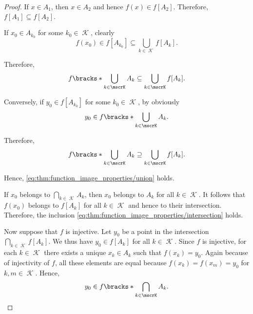 \begin{proof}
   If \( x \in A_1 \), then \( x \in A_2 \) and hence \( f(x) \in f[A_2] \). Therefore, \( f[A_1] \subseteq f[A_2] \).

   If \( x_0 \in A_{k_0} \) for some \( k_0 \in \mscrK \), clearly
  \begin{equation*}
    f(x_0) \in f[A_{k_0}] \subseteq \bigcup_{k \in \mscrK} f[A_k].
  \end{equation*}

  Therefore,
  \begin{equation*}
    f\bracks*{ \bigcup_{k \in \mscrK} A_k } \subseteq \bigcup_{k \in \mscrK} f[A_k].
  \end{equation*}

  Conversely, if \( y_0 \in f[A_{k_0}] \) for some \( k_0 \in \mscrK \), by  obviously
  \begin{equation*}
    y_0 \in f\bracks*{ \bigcup_{k \in \mscrK} A_k }.
  \end{equation*}

  Therefore,
  \begin{equation*}
    f\bracks*{ \bigcup_{k \in \mscrK} A_k } \supseteq \bigcup_{k \in \mscrK} f[A_k].
  \end{equation*}

  Hence, \eqref{eq:thm:function_image_properties/union} holds.

   If \( x_0 \) belongs to \( \bigcap_{k \in \mscrK} A_k \), then \( x_0 \) belongs to \( A_k \) for all \( k \in \mscrK \). It follows that \( f(x_0) \) belongs to \( f[A_k] \) for all \( k \in \mscrK \) and hence to their intersection. Therefore, the inclusion \eqref{eq:thm:function_image_properties/intersection} holds.

  Now suppose that \( f \) is injective. Let \( y_0 \) be a point in the intersection \( \bigcap_{k \in \mscrK} f[A_k] \). We thus have \( y_0 \in f[A_k] \) for all \( k \in \mscrK \). Since \( f \) is injective, for each \( k \in \mscrK \) there exists a unique \( x_k \in A_k \) such that \( f(x_k) = y_0 \). Again because of injectivity of \( f \), all these elements are equal because \( f(x_k) = f(x_m) = y_0 \) for \( k, m \in \mscrK \). Hence,
  \begin{equation*}
    y_0 \in f\bracks*{ \bigcap_{k \in \mscrK} A_k }.
  \end{equation*}


\end{proof}
